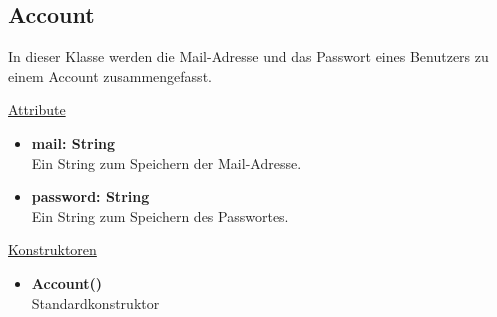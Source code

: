 \newpage
\subsection{Account}\label{Account}
In dieser Klasse werden die Mail-Adresse und das Passwort eines Benutzers zu einem Account zusammengefasst. \newline

\underline{Attribute}
\begin{itemize}
\itemsep0pt
\item \textbf{mail: String} \hfill\\ 
Ein String zum Speichern der Mail-Adresse.

\item \textbf{password: String} \hfill\\ 
Ein String zum Speichern des Passwortes.

\end{itemize}

\underline{Konstruktoren}
\begin{itemize}
\itemsep0pt
\item \textbf{Account()} \hfill\\
Standardkonstruktor
\end{itemize}
